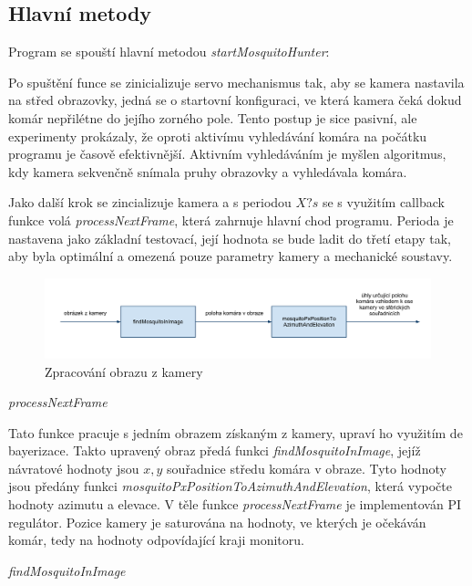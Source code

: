 \documentclass[a4paper,10pt]{article}
\begin{document}
\subsection{Hlavní metody}

		Program se spouští hlavní metodou \textit{startMosquitoHunter}:

		Po spuštění funce se zinicializuje servo mechanismus tak, aby se kamera
		nastavila na střed obrazovky, jedná se o startovní konfiguraci, ve která kamera
		čeká dokud komár nepřilétne do jejího zorného pole. Tento postup je sice
		pasivní, ale experimenty prokázaly, že oproti aktivímu vyhledávání komára na
		počátku programu je časově efektivnější. Aktivním vyhledáváním je myšlen
		algoritmus, kdy kamera sekvenčně snímala pruhy obrazovky a vyhledávala komára.

		Jako další krok se zincializuje kamera a s periodou $X? s$ se s využitím
		callback funkce volá \textit{processNextFrame}, která zahrnuje hlavní chod
		programu. Perioda je nastavena jako základní testovací, její hodnota se bude
		ladit do třetí etapy tak, aby byla optimální a omezená pouze parametry kamery a
		mechanické soustavy. 

		\begin{figure}[!h]
			\centering
			 \includegraphics[width=1\columnwidth]{pics/zpracovani_obrazu_z_kamery}
			 \caption{Zpracování obrazu z kamery\label{fig:zpracovaniObrazu}}
		\end{figure}


\vspace{0.5cm}
\textit{processNextFrame}

		Tato funkce pracuje s jedním obrazem získaným z kamery, upraví ho využitím de
		bayerizace. Takto upravený obraz předá funkci \textit{findMosquitoInImage},
		jejíž návratové hodnoty jsou $x, y$ souřadnice středu komára v obraze. Tyto
		hodnoty jsou předány funkci \textit{mosquitoPxPositionToAzimuthAndElevation},
		která vypočte hodnoty azimutu a elevace. V těle funkce \textit{processNextFrame}
		je implementován PI regulátor. Pozice kamery je saturována na hodnoty, ve
		kterých je očekáván komár, tedy na hodnoty odpovídající kraji monitoru. 

		\vspace{0.5cm}
		\textit{findMosquitoInImage}
\end{document}
